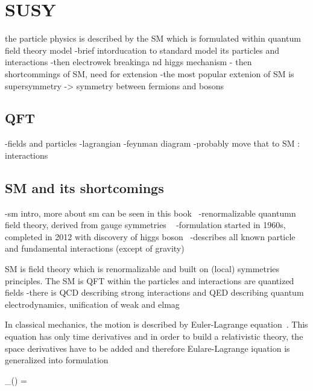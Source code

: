 \chapter{SUSY}

the particle physics is described by the SM which is formulated within quantum field theory model
-brief intorducation to standard model its particles and interactions
-then electrowek breakinga nd higgs mechanism
- then shortcommings of SM, need for extension
-the most popular extenion of SM is supersymmetry -> symmetry between fermions and bosons



\section{QFT}

-fields and particles
-lagrangian
-feynman diagram
-probably move that to SM : interactions

\section{SM and its shortcomings}


-sm intro, more about sm can be seen in this book~\cite{9783527406012} %
-renormalizable quantumn field theory, derived from gauge symmetries ~\cite{tHooft:1971qjg, Weinberg:1967tq}
-formulation started in 1960s, completed in 2012 with discovery of higgs boson~\cite{Chatrchyan:2012xdj, Aad:2012tfa}
-describes all known particle and fundamental interactions (except of gravity)  

SM is field theory which is renormalizable and built on (local) symmetries principles.
The SM is QFT  within the particles and interactions are quantized fields
-there is QCD describing strong interactions and QED describing quantum electrodynamics, unification of weak and elmag


In classical mechanics, the motion is described by Euler-Lagrange equation~\cite{9783527411887}. This equation has only time derivatives and in order to build a relativistic theory, the space derivatives have to be added and therefore Eulare-Lagrange iquation is generalized into formulation

{
 \partial_{\mu}() = 
}



